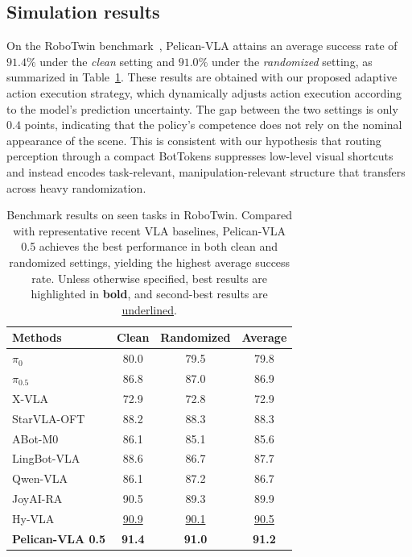 \documentclass[a4paper,table]{extarticle}
\begin{document}
\subsection{Simulation results}
\label{sec:exp:sim}
On the RoboTwin benchmark~\cite{robotwin_2025}, Pelican-VLA attains an average success rate of $\mathbf{91.4\%}$ under the \emph{clean} setting and $\mathbf{91.0\%}$ under the \emph{randomized} setting, as summarized in Table~\ref{tab:benchmark_results}. These results are obtained with our proposed adaptive action execution strategy, which dynamically adjusts action execution according to the model’s prediction uncertainty. The gap between the two settings is only $0.4$ points, indicating that the policy’s competence does not rely on the nominal appearance of the scene. This is consistent with our hypothesis that routing perception through a compact BotTokens suppresses low-level visual shortcuts and instead encodes task-relevant, manipulation-relevant structure that transfers across heavy randomization.


\begin{table}[t]
\small
\centering
\caption{Benchmark results on seen tasks in RoboTwin. Compared with representative recent VLA baselines, Pelican-VLA 0.5 achieves the best performance in both clean and randomized settings, yielding the highest average success rate. Unless otherwise specified, best results are highlighted in \textbf{bold}, and second-best results are \underline{underlined}.}
\label{tab:benchmark_results}
\begin{tabular}{lccc}
\toprule
Methods & Clean & Randomized & Average \\ \midrule
$\pi_{0}$~\cite{pi0_2026}               & 80.0 & 79.5 & 79.8 \\
$\pi_{0.5}$~\cite{pi05_2025}            & 86.8 & 87.0 & 86.9 \\
X-VLA~\cite{x-vla_2025}                 & 72.9 & 72.8 & 72.9 \\
StarVLA-OFT~\cite{starvla_2026}         & 88.2 & 88.3 & 88.3 \\
ABot-M0~\cite{abot-m0_2026}             & 86.1 & 85.1 & 85.6 \\
LingBot-VLA~\cite{lingbot-vla_2026}     & 88.6 & 86.7 & 87.7 \\
Qwen-VLA~\cite{qwen-vla_2026}           & 86.1 & 87.2 & 86.7 \\
JoyAI-RA~\cite{joyai-ra_2026}           & 90.5 & 89.3 & 89.9 \\
Hy-VLA~\cite{hy-embodied-0.5-vla_2026}	&\underline{90.9}	&\underline{90.1} & \underline{90.5}\\
\midrule
\cellcolor{pelicanrow}\textbf{Pelican-VLA 0.5} & \cellcolor{pelicanrow}\textbf{91.4} & \cellcolor{pelicanrow}\textbf{91.0} & \cellcolor{pelicanrow}\textbf{91.2} \\ \bottomrule
\end{tabular}
\vspace{0.2em}
\end{table}
\end{document}
